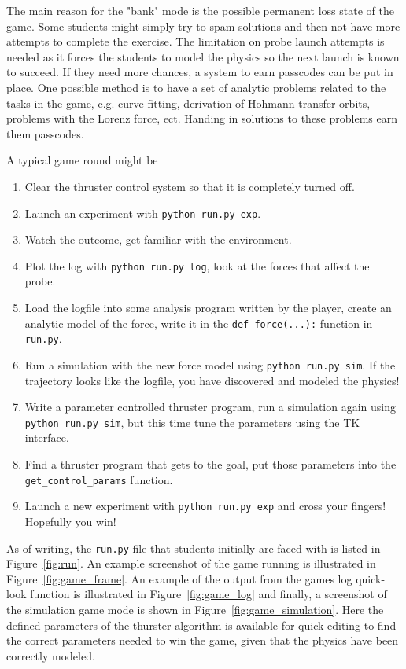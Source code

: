 \documentclass[11pt, twocolumn]{article}
\begin{document}
The main reason for the "bank" mode is the possible permanent loss state of the game. Some students might simply try to spam solutions and then not have more attempts to complete the exercise. The limitation on probe launch attempts is needed as it forces the students to model the physics so the next launch is known to succeed. If they need more chances, a system to earn passcodes can be put in place. One possible method is to have a set of analytic problems related to the tasks in the game, e.g. curve fitting, derivation of Hohmann transfer orbits, problems with the Lorenz force, ect. Handing in solutions to these problems earn them passcodes.

A typical game round might be
\begin{enumerate}
\item Clear the thruster control system so that it is completely turned off.
\item Launch an experiment with \texttt{python run.py exp}.
\item Watch the outcome, get familiar with the environment.
\item Plot the log with \texttt{python run.py log}, look at the forces that affect the probe.
\item Load the logfile into some analysis program written by the player, create an analytic model of the force, write it in the \texttt{def force(...):} function in \texttt{run.py}.
\item Run a simulation with the new force model using \texttt{python run.py sim}. If the trajectory looks like the logfile, you have discovered and modeled the physics!
\item Write a parameter controlled thruster program, run a simulation again using \texttt{python run.py sim}, but this time tune the parameters using the TK interface.
\item Find a thruster program that gets to the goal, put those parameters into the \texttt{get\_control\_params} function.
\item Launch a new experiment with \texttt{python run.py exp} and cross your fingers! Hopefully you win!
\end{enumerate}

As of writing, the \texttt{run.py} file that students initially are faced with is listed in Figure~\ref{fig:run}. An example screenshot of the game running is illustrated in Figure~\ref{fig:game_frame}. An example of the output from the games log quick-look function is illustrated in Figure~\ref{fig:game_log} and finally, a screenshot of the simulation game mode is shown in Figure~\ref{fig:game_simulation}. Here the defined parameters of the thurster algorithm is available for quick editing to find the correct parameters needed to win the game, given that the physics have been correctly modeled.
\end{document}
